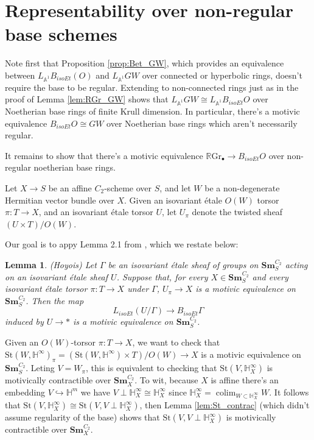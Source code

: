\documentclass[edeposit,fullpage]{uiucthesis2009}
\newcommand{\mbb}{\mathbb}
\newcommand{\RGr}{\mathbb R\mathrm{Gr}}
\newcommand{\Sm}[1]{\mathbf{Sm}_{#1}}
\newcommand{\St}{\mathrm{St}}
\DeclareMathOperator*{\colim}{colim}
\theoremstyle{plain}
\newtheorem{lemma}{Lemma}
\numberwithin{lemma}{section}
\theoremstyle{definition}
\begin{document}
\section{Representability over non-regular base schemes}

Note first that Proposition \ref{prop:Bet_GW}, which provides an 
equivalence between $L_{\mbb A^1}B_{isoEt}(O)$ and $L_{\mbb A^1}GW$
over connected or hyperbolic rings, doesn't require the base
to be regular. Extending to non-connected rings just as in the proof
of Lemma \ref{lem:RGr_GW} shows that $L_{\mbb A^1}GW \cong
L_{\mbb A^1} B_{isoEt}O$ over Noetherian base rings of finite Krull dimension. In particular,
there's a motivic equivalence $B_{isoEt}O \cong GW$ over Noetherian
base rings which aren't necessarily regular.

It remains to show that there's a motivic equivalence $\RGr_\bullet
\rightarrow B_{isoEt}O$ over non-regular noetherian base rings. 

Let  $X \rightarrow S$ be an affine
$C_2$-scheme over $S$, and let $W$ be a non-degenerate Hermitian
vector bundle over $X$. Given an isovariant \'etale $O(W)$
torsor $\pi : T \rightarrow X$, and an isovariant \'etale torsor $U$, let $U_\pi$ denote
the twisted sheaf $(U \times T)/O(W)$. 

Our goal is to appy Lemma 2.1 from \cite{cdhdesc}, which we restate below:

\begin{lemma}(Hoyois)
Let $\Gamma$ be an isovariant \'etale sheaf of groups on $\Sm{S}^{C_2}$
acting on an isovariant \'etale sheaf $U$. Suppose that, for every $X
\in \Sm{S}^{C_2}$ and every isovariant \'etale torsor $\pi: T
\rightarrow X$ under $\Gamma$, $U_\pi \rightarrow X$ is a motivic
equivalence on $\Sm{S}^{C_2}$. Then the map
\[
L_{isoEt}(U/\Gamma) \rightarrow B_{isoEt}\Gamma
\]
induced by $U \rightarrow \ast$ is a motivic equivalence on $\Sm{S}^{C_2}$.
\end{lemma}

Given an $O(W)$-torsor $\pi : T \rightarrow X$, we want to check that $\St(W,\mbb H^\infty)_\pi  =(\St(W,\mbb H^\infty) \times T)/O(W) \rightarrow
X$ is a motivic equivalence on $\Sm{S}^{C_2}$. Leting $V = W_\pi$,
this is equivalent to checking
that $\St(V,\mbb H^\infty_X)$ is motivically contractible
over $\Sm{X}^{C_2}$. To wit, because $X$ is affine there's an
embedding $V \hookrightarrow \mbb H^m$ we have $V \perp \mbb
H^\infty_X \cong \mbb H^\infty_X$ since $\mbb H^\infty_X = \colim_{W
  \subset \mbb H^\infty_X} W$. It follows that $\St(V,\mbb H^\infty_X)
\cong \St(V,V \perp \mbb H^\infty_X)$, then Lemma
\ref{lem:St_contrac} (which didn't assume regularity of the base) shows
that $\St(V,V \perp \mbb H^\infty_X)$ is motivically contractible over
$\Sm{X}^{C_2}$. 
\end{document}
